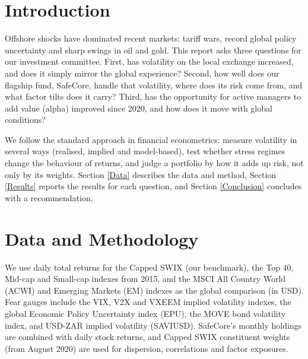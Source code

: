\documentclass[11pt,preprint]{elsarticle}
\numberwithin{equation}{section}
\numberwithin{figure}{section}
\numberwithin{table}{section}
\begin{document}
\setcounter{footnote}{0}



\pagestyle{fancy}
\chead{}
\rhead{}
\lfoot{}
\lhead{}
\cfoot{}


\headsep 35pt %




\section{\texorpdfstring{Introduction
\label{Introduction}}{Introduction }}\label{introduction}

Offshore shocks have dominated recent markets: tariff wars, record
global policy uncertainty and sharp swings in oil and gold. This report
asks three questions for our investment committee. First, has volatility
on the local exchange increased, and does it simply mirror the global
experience? Second, how well does our flagship fund, SafeCore, handle
that volatility, where does its risk come from, and what factor tilts
does it carry? Third, has the opportunity for active managers to add
value (alpha) improved since 2020, and how does it move with global
conditions?

We follow the standard approach in financial econometrics: measure
volatility in several ways (realised, implied and model-based), test
whether stress regimes change the behaviour of returns, and judge a
portfolio by how it adds up risk, not only by its weights. Section
\ref{Data} describes the data and method, Section \ref{Results} reports
the results for each question, and Section \ref{Conclusion} concludes
with a recommendation.

\section{\texorpdfstring{Data and Methodology
\label{Data}}{Data and Methodology }}\label{data-and-methodology}

We use daily total returns for the Capped SWIX (our benchmark), the Top
40, Mid-cap and Small-cap indexes from 2015, and the MSCI All Country
World (ACWI) and Emerging Markets (EM) indexes as the global comparison
(in USD). Fear gauges include the VIX, V2X and VXEEM implied volatility
indexes, the global Economic Policy Uncertainty index (EPU), the MOVE
bond volatility index, and USD-ZAR implied volatility (SAVIUSD).
SafeCore's monthly holdings are combined with daily stock returns, and
Capped SWIX constituent weights (from August 2020) are used for
dispersion, correlations and factor exposures.
\end{document}
